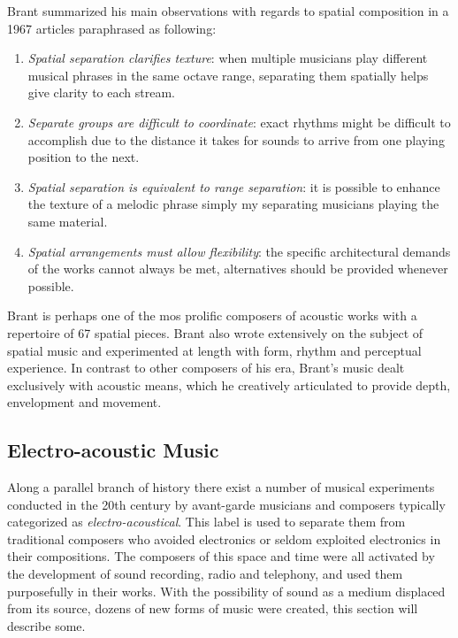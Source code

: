 Brant summarized his main observations with regards to spatial composition in a 1967 articles paraphrased as following: 

\begin{enumerate}
    \item \textit{Spatial separation clarifies texture}: when multiple musicians play different musical phrases in the same octave range, separating them spatially helps give clarity to each stream. 
    \item \textit{Separate groups are difficult to coordinate}: exact rhythms might be difficult to accomplish due to the distance it takes for sounds to arrive from one playing position to the next. 
    \item \textit{Spatial separation is equivalent to range separation}: it is possible to enhance the texture of a melodic phrase simply my separating musicians playing the same material.  
    \item \textit{Spatial arrangements must allow flexibility}: the specific architectural demands of the works cannot always be met, alternatives should be provided whenever possible.
\end{enumerate}

Brant is perhaps one of the mos prolific composers of acoustic works with a repertoire of 67 spatial pieces. Brant also wrote extensively on the subject of spatial music and experimented at length with form, rhythm and perceptual experience. In contrast to other composers of his era, Brant's music dealt exclusively with acoustic means, which he creatively articulated to provide depth, envelopment and movement.  


\subsection{Electro-acoustic Music} \label{subsec:elec_acoustic_mus}

Along a parallel branch of history there exist a number of musical experiments conducted in the 20th century by avant-garde musicians and composers typically categorized as \textit{electro-acoustical}. This label is used to separate them from traditional composers who avoided electronics or seldom exploited electronics in their compositions. The composers of this space and time were all activated by the development of sound recording, radio and telephony, and used them purposefully in their works. With the possibility of sound as a medium displaced from its source, dozens of new forms of music were created, this section will describe some. 

